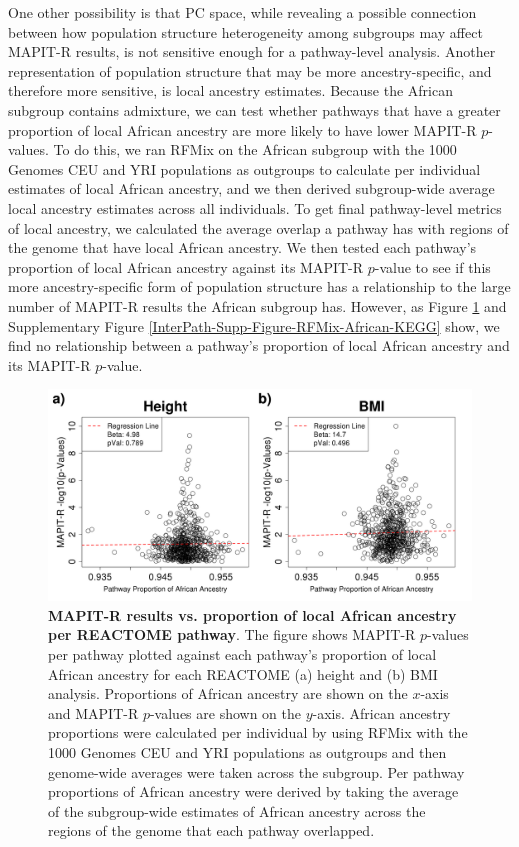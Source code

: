 One other possibility is that PC space, while revealing a possible connection between how population structure heterogeneity among subgroups may affect MAPIT-R results, is not sensitive enough for a pathway-level analysis. Another representation of population structure that may be more ancestry-specific, and therefore more sensitive, is local ancestry estimates. Because the African subgroup contains admixture, we can test whether pathways that have a greater proportion of local African ancestry are more likely to have lower MAPIT-R $p$-values. To do this, we ran RFMix \citep{Maples2013} on the African subgroup with the 1000 Genomes CEU and YRI \citep{Genomes2015} populations as outgroups to calculate per individual estimates of local African ancestry, and we then derived subgroup-wide average local ancestry estimates across all individuals. To get final pathway-level metrics of local ancestry, we calculated the average overlap a pathway has with regions of the genome that have local African ancestry. We then tested each pathway's proportion of local African ancestry against its MAPIT-R $p$-value to see if this more ancestry-specific form of population structure has a relationship to the large number of MAPIT-R results the African subgroup has. However, as Figure \ref{InterPath-Main-Figure-RFMix-African-REACTOME} and Supplementary Figure \ref{InterPath-Supp-Figure-RFMix-African-KEGG} show, we find no relationship between a pathway's proportion of local African ancestry and its MAPIT-R $p$-value.




\begin{figure}[htb]
\centering
\includegraphics[scale=.35]{Images/Main/InterPath_Main_Figure_RFMix_vs2_African_REACTOME_noHLA.png}
\caption[TBD]{\textbf{MAPIT-R results vs. proportion of local African ancestry per REACTOME pathway}. The figure shows MAPIT-R $p$-values per pathway plotted against each pathway's proportion of local African ancestry for each REACTOME (a) height and (b) BMI analysis. Proportions of African ancestry are shown on the $x$-axis and MAPIT-R $p$-values are shown on the $y$-axis. African ancestry proportions were calculated per individual by using RFMix with the 1000 Genomes CEU and YRI populations as outgroups and then genome-wide averages were taken across the subgroup. Per pathway proportions of African ancestry were derived by taking the average of the subgroup-wide estimates of African ancestry across the regions of the genome that each pathway overlapped.}
\label{InterPath-Main-Figure-RFMix-African-REACTOME}
\end{figure}


